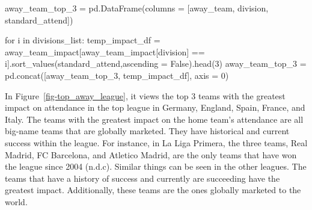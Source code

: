 \documentclass[
  letterpaper,
  DIV=11,
  numbers=noendperiod]{scrartcl}
\newenvironment{Shaded}{\begin{snugshade}}{\end{snugshade}}
\newcommand{\ControlFlowTok}[1]{\textcolor[rgb]{0.00,0.23,0.31}{#1}}
\newcommand{\DecValTok}[1]{\textcolor[rgb]{0.68,0.00,0.00}{#1}}
\newcommand{\KeywordTok}[1]{\textcolor[rgb]{0.00,0.23,0.31}{#1}}
\newcommand{\NormalTok}[1]{\textcolor[rgb]{0.00,0.23,0.31}{#1}}
\newcommand{\OperatorTok}[1]{\textcolor[rgb]{0.37,0.37,0.37}{#1}}
\newcommand{\StringTok}[1]{\textcolor[rgb]{0.13,0.47,0.30}{#1}}
\newcommand{\VariableTok}[1]{\textcolor[rgb]{0.07,0.07,0.07}{#1}}
\begin{document}
\begin{Shaded}
\begin{Highlighting}[]
\NormalTok{away\_team\_top\_3 }\OperatorTok{=}\NormalTok{ pd.DataFrame(columns }\OperatorTok{=}\NormalTok{ [}\StringTok{\textquotesingle{}away\_team\textquotesingle{}}\NormalTok{, }\StringTok{\textquotesingle{}division\textquotesingle{}}\NormalTok{, }\StringTok{\textquotesingle{}standard\_attend\textquotesingle{}}\NormalTok{])}


\ControlFlowTok{for}\NormalTok{ i }\KeywordTok{in}\NormalTok{ divisions\_list:}
\NormalTok{        temp\_impact\_df }\OperatorTok{=}\NormalTok{ away\_team\_impact[away\_team\_impact[}\StringTok{\textquotesingle{}division\textquotesingle{}}\NormalTok{] }\OperatorTok{==}\NormalTok{ i].sort\_values(}\StringTok{\textquotesingle{}standard\_attend\textquotesingle{}}\NormalTok{,ascending }\OperatorTok{=} \VariableTok{False}\NormalTok{).head(}\DecValTok{3}\NormalTok{)}
\NormalTok{        away\_team\_top\_3 }\OperatorTok{=}\NormalTok{ pd.concat([away\_team\_top\_3, temp\_impact\_df], axis }\OperatorTok{=} \DecValTok{0}\NormalTok{)}
\end{Highlighting}
\end{Shaded}

In Figure~\ref{fig-top_away_league}, it views the top 3 teams with the
greatest impact on attendance in the top league in Germany, England,
Spain, France, and Italy. The teams with the greatest impact on the home
team's attendance are all big-name teams that are globally marketed.
They have historical and current success within the league. For
instance, in La Liga Primera, the three teams, Real Madrid, FC
Barcelona, and Atletico Madrid, are the only teams that have won the
league since 2004 (n.d.c). Similar things can be seen in the other
leagues. The teams that have a history of success and currently are
succeeding have the greatest impact. Additionally, these teams are the
ones globally marketed to the world.
\end{document}
